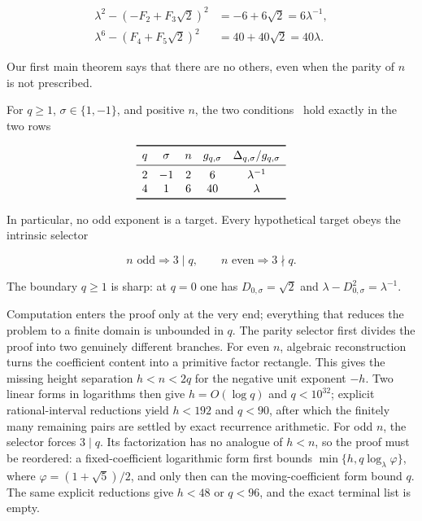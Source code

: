 \begin{align}
 \lambda^2-(-F_2+F_3\sqrt2)^2
 &=-6+6\sqrt2=6\lambda^{-1},
 \label{eq:intro-example-minus}\\
 \lambda^6-(F_4+F_5\sqrt2)^2
 &=40+40\sqrt2=40\lambda.
 \label{eq:intro-example-plus}
\end{align}

Our first main theorem says that there are no others, even when the parity
of $n$ is not prescribed.

\begin{theorem}
\label{thm:classification-intro}
For $q\geqslant1$, $\sigma\in\{1,-1\}$, and positive $n$, the two conditions~ hold exactly
in the two rows

\begin{equation}
 \begin{array}{ccccc}
 \toprule
 q&\sigma&n&g_{q,\sigma}&\Delta_{q,\sigma}/g_{q,\sigma}\\
 \midrule
 2&-1&2&6&\lambda^{-1}\\
 4& 1&6&40&\lambda\\
 \bottomrule
 \end{array}
 \label{eq:two-solutions}
\end{equation}

In particular, no odd exponent is a target. Every hypothetical target obeys
the intrinsic selector

\begin{equation}
 n\text{ odd}\Longrightarrow3\mid q,
 \qquad
 n\text{ even}\Longrightarrow3\nmid q.
 \label{eq:intro-parity-selector}
\end{equation}
\end{theorem}

The boundary $q\geqslant1$ is sharp: at $q=0$ one has
$D_{0,\sigma}=\sqrt2$ and $\lambda-D_{0,\sigma}^2=\lambda^{-1}$.

Computation enters the proof only at the very end; everything that reduces
the problem to a finite domain is unbounded in $q$.
The parity selector first divides the proof into two genuinely different
branches. For even $n$, algebraic reconstruction turns the coefficient
content into a primitive factor rectangle. This gives the missing height
separation $h<n<2q$ for the negative unit exponent $-h$. Two linear forms in
logarithms then give $h=O(\log q)$ and $q<10^{32}$; explicit
rational-interval reductions yield $h<192$ and $q<90$, after which the
finitely many remaining pairs are settled by exact recurrence arithmetic. For odd $n$, the selector forces
$3\mid q$. Its factorization has no analogue of $h<n$, so the proof must be
reordered: a fixed-coefficient logarithmic form first bounds
$\min\{h,q\log_\lambda\varphi\}$, where $\varphi=(1+\sqrt5)/2$, and only then
can the moving-coefficient
form bound $q$. The same explicit reductions give $h<48$ or $q<96$, and
the exact terminal list is empty.

